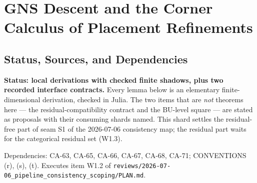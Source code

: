 
\section{GNS Descent and the Corner Calculus of Placement Refinements}
\label{sec:gns-descent-corner-calculus}

\subsection{Status, Sources, and Dependencies}

\textbf{Status: local derivations with checked finite shadows, plus two
recorded interface contracts.}  Every lemma below is an elementary
finite-dimensional derivation, checked in Julia.  The two items that are
\emph{not} theorems here --- the residual-compatibility contract and the
BU-level square --- are stated as proposals with their consuming shards
named.  This shard settles the residual-free part of seam S1 of the
2026-07-06 consistency map; the residual part waits for the categorical
residual set (W1.3).

Dependencies: CA-63, CA-65, CA-66, CA-67, CA-68, CA-71; CONVENTIONS (r),
(s), (t).  Executes item W1.2 of
\texttt{reviews/2026-07-06\_pipeline\_consistency\_scoping/PLAN.md}.


